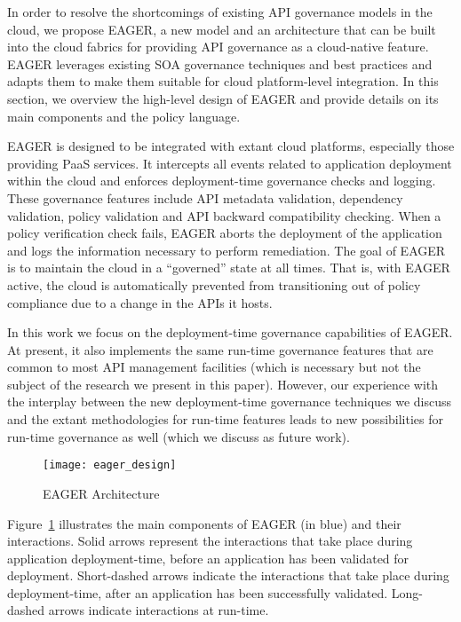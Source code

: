 In order to resolve the shortcomings of existing API governance models in the
cloud, we propose EAGER, a new model and an architecture that can be built
into the cloud fabrics for providing API governance as a cloud-native feature.
EAGER leverages existing SOA governance techniques and 
best practices and adapts them to make them
suitable for cloud platform-level integration.
In this section, we
overview the high-level design of EAGER and provide details on its main
components and the policy language.

EAGER is designed to be integrated with extant cloud platforms, 
especially those providing PaaS services. 
It intercepts all events related to application deployment within the cloud
and enforces deployment-time governance checks and
logging. 
These governance features include API metadata validation, 
dependency validation, policy validation and 
API backward compatibility
checking. When a policy verification check fails, 
EAGER aborts the deployment of the application and logs the information
necessary to perform remediation.  The goal of EAGER is to maintain the cloud
in a ``governed'' state at all times.  That is, with EAGER active, the cloud
is
automatically prevented from transitioning out of policy compliance due to a
change in the APIs it hosts.

In this work we focus on the deployment-time governance capabilities of EAGER. 
At present, it also implements the same run-time governance features that are
common to most API management facilities (which is necessary but not the
subject of the research we present in this paper).
However, our experience with the interplay between the new deployment-time
governance techniques we discuss and the extant methodologies for run-time
features leads to new possibilities for run-time governance as well (which we
discuss as future work).

\begin{figure}
\centering
\texttt{[image: eager\_design]}
\caption{EAGER Architecture}
\label{fig:eager_design}
\end{figure}

Figure~\ref{fig:eager_design} illustrates the main components of EAGER (in
blue) and their interactions. Solid arrows represent the interactions that take place
during application deployment-time, before an application has been validated
for deployment. Short-dashed arrows indicate the interactions that take place
during deployment-time, after an application has been successfully validated.
Long-dashed arrows indicate interactions at run-time.

